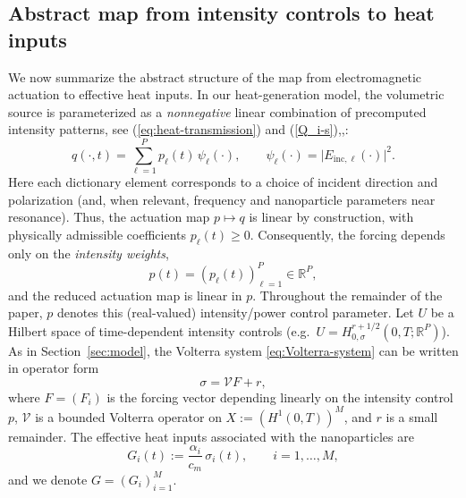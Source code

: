 \documentclass[11pt,a4paper]{article}
\numberwithin{equation}{section}
\theoremstyle{definition}
\newcommand{\R}{\mathbb{R}}
\newcommand{\1}{\mathbbm{1}}
\begin{document}
\subsection{Abstract map from intensity controls to heat inputs} \label{sec:map-EM-Heat}
\noindent
We now summarize the abstract structure of the map from electromagnetic actuation to effective
heat inputs.
In our heat-generation model, the volumetric source is parameterized as a \textit{nonnegative} linear combination of precomputed intensity patterns,  see (\ref{eq:heat-transmission}) and (\ref{Q_i-s}),,:
\begin{equation}\label{eq:heat-source-dictionary}
q(\cdot,t)=\sum_{\ell=1}^P p_\ell(t)\,\psi_\ell(\cdot),
\qquad 
\psi_\ell(\cdot)=\bigl|E_{\mathrm{inc},\ell}(\cdot)\bigr|^2.
\end{equation}
Here each dictionary element corresponds to a choice of incident direction and polarization (and, when relevant, frequency and nanoparticle parameters near resonance). Thus, the actuation map $p\mapsto q$ is linear by construction, with physically admissible coefficients $p_\ell(t)\ge 0$. Consequently, the forcing depends only on the \emph{intensity weights},
\[
 p(t)=(p_\ell(t))_{\ell=1}^P\in\R^P,
\]
and the reduced actuation map is linear in $p$. Throughout the remainder of the paper, $p$ denotes this
(real-valued) intensity/power control parameter.
Let $U$ be a Hilbert space of time-dependent intensity controls (e.g.\ $U=H^{r+1/2}_{0,\sigma}(0,T;\R^P)$). As in
Section~\ref{sec:model}, the Volterra system \eqref{eq:Volterra-system} can be written in operator form
\[
\sigma = \mathcal{V}F + r,
\]
where $F=(F_i)$ is the forcing vector depending linearly on the intensity control $p$, $\mathcal{V}$ is a bounded Volterra operator on
$X:=(H^1(0,T))^M$, and $r$ is a small remainder. The effective heat
inputs associated with the nanoparticles are
\begin{equation}
\label{eq:Gi-sigma}
G_i(t) := \frac{\alpha_i}{c_m}\,\sigma_i(t),\qquad i=1,\dots,M,
\end{equation}
and we denote $G=(G_i)_{i=1}^M$.
\end{document}
